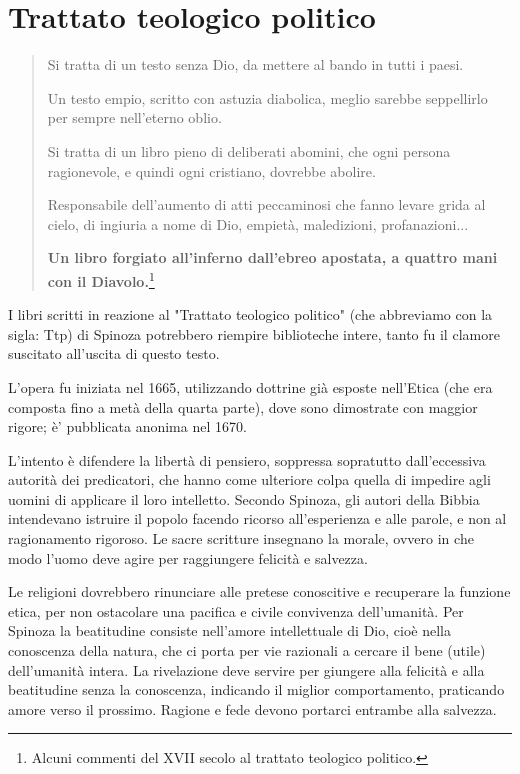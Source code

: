 \chapter{Trattato teologico politico}

\bigskip
\bigskip

\begin{quotation}
	\small Si tratta di un testo senza Dio, da mettere al bando in tutti i paesi.
	
	Un testo empio, scritto con astuzia diabolica, meglio sarebbe seppellirlo per sempre nell'eterno oblio.
	
	Si tratta di un libro pieno di deliberati abomini, che ogni persona ragionevole, e quindi ogni cristiano, dovrebbe abolire.
	
	Responsabile dell'aumento di atti peccaminosi che fanno levare grida al cielo, di ingiuria a nome di Dio, empietà, maledizioni, profanazioni...
	
	\textbf{Un libro forgiato all'inferno dall'ebreo apostata, a quattro mani con il Diavolo.}\footnote{Alcuni commenti del XVII secolo al trattato teologico politico.}
		
\end{quotation}

I libri scritti in reazione al "Trattato teologico politico" (che abbreviamo con la sigla: Ttp) di Spinoza potrebbero riempire biblioteche intere, tanto fu il clamore suscitato all'uscita di questo testo.

L'opera fu iniziata nel 1665, utilizzando dottrine già esposte nell'Etica (che era composta fino a metà della quarta parte), dove sono dimostrate con maggior rigore; è' pubblicata anonima nel 1670. 

L'intento è difendere la libertà di pensiero, soppressa sopratutto dall'eccessiva autorità dei predicatori, che hanno come ulteriore colpa quella di impedire agli uomini di applicare il loro intelletto. Secondo Spinoza, gli autori della Bibbia intendevano istruire il popolo facendo ricorso all'esperienza e alle parole, e non al ragionamento rigoroso. Le sacre scritture insegnano la morale, ovvero in che modo l'uomo deve agire per raggiungere felicità e salvezza. 

Le religioni dovrebbero rinunciare alle pretese conoscitive e recuperare la funzione etica, per non ostacolare una pacifica e civile convivenza dell'umanità. Per Spinoza la beatitudine consiste nell'amore intellettuale di Dio, cioè nella conoscenza della natura, che ci porta per vie razionali a cercare il bene (utile) dell'umanità intera. La rivelazione deve servire per giungere alla felicità e alla beatitudine senza la conoscenza, indicando il miglior comportamento, praticando amore verso il prossimo. Ragione e fede devono portarci entrambe alla salvezza.

